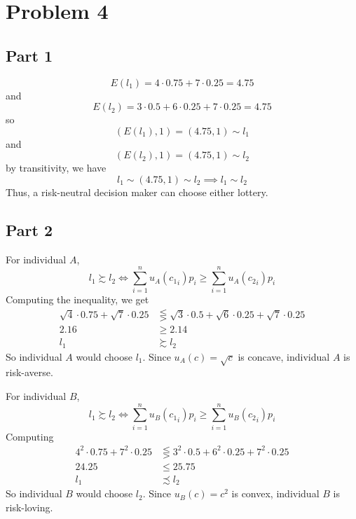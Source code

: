 \documentclass[12pt]{extarticle}
\numberwithin{table}{section}
\numberwithin{figure}{section}
\numberwithin{equation}{section}
\begin{document}
\section*{Problem 4}

\subsection*{Part 1}
\begin{equation}
    E(l_1) = 4 \cdot 0.75 + 7 \cdot 0.25 = 4.75
\end{equation}
and
\begin{equation}
    E(l_2) = 3 \cdot 0.5 + 6 \cdot 0.25 + 7 \cdot 0.25 = 4.75
\end{equation}
so
\begin{equation}
    (E(l_1), 1) = (4.75, 1) \sim l_1
\end{equation}
and
\begin{equation}
    (E(l_2), 1) = (4.75, 1) \sim l_2
\end{equation}
by transitivity, we have
\begin{equation}
    l_1 \sim (4.75, 1) \sim l_2 \implies l_1 \sim l_2
\end{equation}
Thus, a risk-neutral decision maker can choose either lottery.

\subsection*{Part 2}
For individual $A$,
\begin{equation}
    l_1 \succsim l_2 \iff \sum_{i = 1}^n u_A({c_1}_i) p_i \ge \sum_{i = 1}^n u_A({c_2}_i) p_i
\end{equation}
Computing the inequality, we get
\begin{align}
    \sqrt{4} \cdot 0.75 + \sqrt7 \cdot 0.25 & \lesseqgtr \sqrt3 \cdot 0.5 + \sqrt6 \cdot 0.25 + \sqrt7 \cdot 0.25 \\
    2.16                                    & \ge 2.14                                                            \\
    l_1                                     & \succsim l_2
\end{align}
So individual $A$ would choose $l_1$. Since $u_A(c) = \sqrt c$ is concave, individual $A$ is risk-averse.

For individual $B$,
\begin{equation}
    l_1 \succsim l_2 \iff \sum_{i = 1}^n u_B({c_1}_i)p_i \ge \sum_{i = 1}^n u_B({c_2}_i) p_i
\end{equation}
Computing
\begin{align}
    4^2 \cdot 0.75 + 7^2 \cdot 0.25 & \lesseqgtr 3^2 \cdot 0.5 + 6^2 \cdot 0.25 + 7^2 \cdot 0.25 \\
    24.25                           & \le 25.75                                                  \\
    l_1                             & \precsim l_2
\end{align}
So individual $B$ would choose $l_2$. Since $u_B(c) = c^2$ is convex, individual $B$ is risk-loving.
\end{document}
